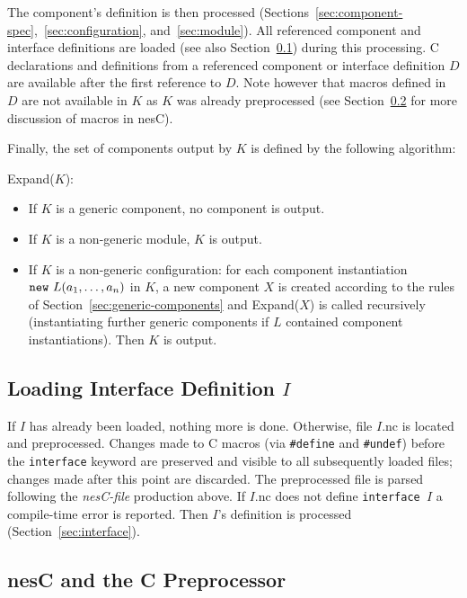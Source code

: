 \documentclass[11pt,letterpaper]{article}
\newcommand{\kw}[1]{{\tt #1}}
\newcommand{\code}[1]{{\tt #1}}
\newcommand{\nesc}{nesC\xspace}
\begin{document}
The component's definition is then processed
(Sections~\ref{sec:component-spec},~\ref{sec:configuration},
and~\ref{sec:module}). All referenced component and interface definitions
are loaded (see also Section~\ref{sec:load-intf}) during this processing.
C declarations and definitions from a referenced component or interface
definition $D$ are available after the first reference to $D$. Note
however that macros defined in $D$ are not available in $K$ as $K$
was already preprocessed (see Section~\ref{sec:cpp} for more discussion
of macros in \nesc).

Finally, the set of components output by $K$ is defined by the following
algorithm:

Expand($K$):
\begin{itemize}
\item If $K$ is a generic component, no component is output.

\item If $K$ is a non-generic module, $K$ is output.

\item If $K$ is a non-generic configuration: for each component
instantiation $\kw{new}\ L(a_1, \ldots, a_n)$ in $K$, a new component $X$ is
created according to the rules of Section~\ref{sec:generic-components} and
Expand($X$) is called recursively (instantiating further generic components
if $L$ contained component instantiations). Then $K$ is output.
\end{itemize}

\subsection{Loading Interface Definition $I$}
\label{sec:load-intf}

If $I$ has already been loaded, nothing more is done. Otherwise, file
$I$.nc is located and preprocessed. Changes made to C macros (via
\code{\#define} and \code{\#undef}) before the \kw{interface} keyword are
preserved and visible to all subsequently loaded files; changes made after
this point are discarded. The preprocessed file is parsed following the
\emph{nesC-file} production above. If $I$.nc does not define
\code{interface $I$} a compile-time error is reported. Then
$I$'s definition is processed (Section~\ref{sec:interface}).

\subsection{\nesc and the C Preprocessor}
\label{sec:cpp}
\end{document}
